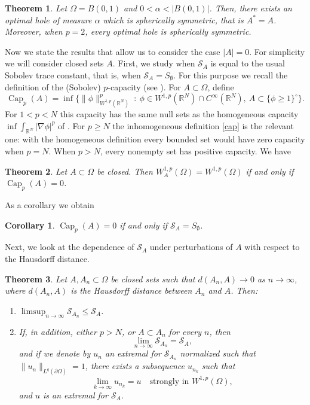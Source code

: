 \documentclass[11pt]{amsart}
\newtheorem{theorem}{Theorem}[section]
\newtheorem{corollary}{Corollary}[section]
\theoremstyle{remark}
\numberwithin{equation}{section}
\newcommand{\R}{\mathbb{R}}
\newcommand{\cS}{\mathcal{S}}
\DeclareMathOperator{\capa}{Cap}
\begin{document}
\begin{theorem}\label{t.sym}
Let $\Omega=B(0,1)$ and $0<\alpha<|B(0,1)|$. Then, there exists an optimal hole of measure $\alpha$ which is spherically symmetric, that is $A^*=A$. Moreover, when $p=2$, every optimal hole is spherically symmetric.
\end{theorem}

Now we state the results that allow us to consider the case $|A|=0$. For simplicity we will consider closed sets $A$. First, we study when $\cS_A$ is equal to the usual Sobolev trace constant, that is, when $\cS_A=S_\emptyset$. For this purpose we recall the definition of the (Sobolev) $p$-capacity (see \cite{AH,EG}). For $A\subset\Omega$, define
\begin{equation}\label{cap}
\capa_p(A)=\inf\Big\{\|\phi\|^p_{W^{1,p}(\R^N)}\ :\ \phi\in W^{1,p}(\R^N)\cap C^\infty(\R^N),\ A\subset\{\phi\ge1\}^\circ\Big\}.
\end{equation}
For $1<p<N$ this capacity has the same null sets as the homogeneous capacity $\inf\int_{\R^N}|\nabla\phi|^p$ of \cite{EG}. For $p\ge N$ the inhomogeneous definition \eqref{cap} is the relevant one: with the homogeneous definition every bounded set would have zero capacity when $p=N$. When $p>N$, every nonempty set has positive capacity. We have

\begin{theorem}\label{t.cap}
Let $A\subset\Omega$ be closed. Then $W^{1,p}_A(\Omega)=W^{1,p}(\Omega)$ if and only if $\capa_p(A)=0$.
\end{theorem}

As a corollary we obtain

\begin{corollary}\label{c.cap}
$\capa_p(A)=0$ if and only if $\cS_A=S_\emptyset$.
\end{corollary}

Next, we look at the dependence of $\cS_A$ under perturbations of $A$ with respect to the Hausdorff distance.

\begin{theorem}\label{t.cont}
Let $A,A_n\subset\Omega$ be closed sets such that $d(A_n,A)\to0$ as $n\to\infty$, where $d(A_n,A)$ is the Hausdorff distance between $A_n$ and $A$. Then:
\begin{enumerate}
\item[(a)] $\displaystyle\limsup_{n\to\infty}\cS_{A_n}\le\cS_A$.
\item[(b)] If, in addition, either $p>N$, or $A\subset A_n$ for every $n$, then
\[
\lim_{n\to\infty}\cS_{A_n}=\cS_A,
\]
and if we denote by $u_n$ an extremal for $\cS_{A_n}$ normalized such that $\|u_n\|_{L^q(\partial\Omega)}=1$, there exists a subsequence $u_{n_k}$ such that
\begin{equation}\label{conv.ext}
\lim_{k\to\infty}u_{n_k}=u\quad\text{strongly in } W^{1,p}(\Omega),
\end{equation}
and $u$ is an extremal for $\cS_A$.
\end{enumerate}
\end{theorem}
\end{document}
